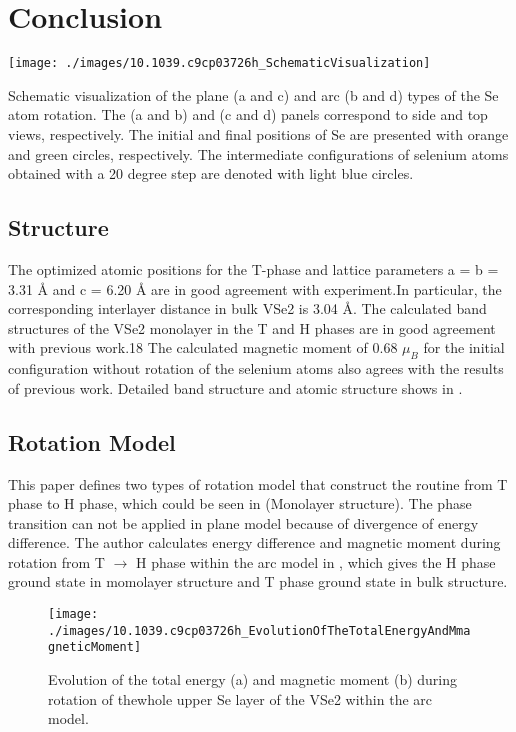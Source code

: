 \section{Conclusion}
\begin{marginfigure}
    \texttt{[image: ./images/10.1039.c9cp03726h\_SchematicVisualization]}
	\caption[Schematic visualization of the plane and arc types of the Se atom rotation]{
        Schematic visualization of the plane (a and c) and arc (b and d) types of the Se atom rotation. The (a and b) and (c and d) panels correspond to side and top views, respectively. The initial and final positions of Se are presented with orange and green circles, respectively. The intermediate configurations of selenium atoms obtained with a 20 degree step are denoted with light blue circles.
	}
\end{marginfigure}
\subsection{Structure}
The optimized atomic positions for the T-phase and lattice parameters a = b = 3.31 Å and c = 6.20 Å are in good agreement with experiment.In particular, the corresponding interlayer distance in bulk VSe2 is 3.04 Å. The calculated band structures of the VSe2 monolayer in the T and H phases are in good agreement with previous work.18 The calculated magnetic moment of 0.68 $\mu_B$ for the initial configuration without rotation of the selenium atoms also agrees with the results of previous work. Detailed band structure and atomic structure shows in .

\subsection{Rotation Model}
This paper defines two types of rotation model that construct the routine from T phase to H phase, which could be seen in (Monolayer structure). The phase transition can not be applied in plane model because of divergence of energy difference. The author calculates energy difference and magnetic moment during rotation from T $\rightarrow$ H phase within the arc model in , which gives the H phase ground state in momolayer structure and T phase ground state in bulk structure.

\begin{figure}[ht] 
    \texttt{[image: ./images/10.1039.c9cp03726h\_EvolutionOfTheTotalEnergyAndMmagneticMoment]}
	\caption[Evolution of the total energy and magnetic moment during rotation for monolayer/bulk VSe2]{
		Evolution of the total energy (a) and magnetic moment (b) during rotation of thewhole upper Se layer of the VSe2 within the arc model.
	}
\end{figure}

